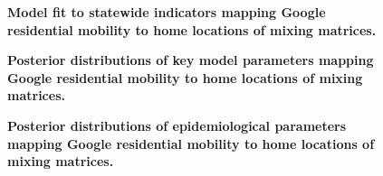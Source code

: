 \begin{figure}[ht]
    \caption{\textbf{Model fit to statewide indicators mapping Google residential mobility to home locations of mixing matrices.}}
    \label{fig:residential_sensitivity_outputs}
\end{figure}

\begin{figure}[ht]
    \caption{\textbf{Posterior distributions of key model parameters mapping Google residential mobility to home locations of mixing matrices.}}
    \label{fig:residential_sensitivity_key_params}
\end{figure}

\begin{figure}[ht]
    \caption{\textbf{Posterior distributions of epidemiological parameters mapping Google residential mobility to home locations of mixing matrices.}}
    \label{fig:residential_sensitivity_epi_params}
\end{figure}
